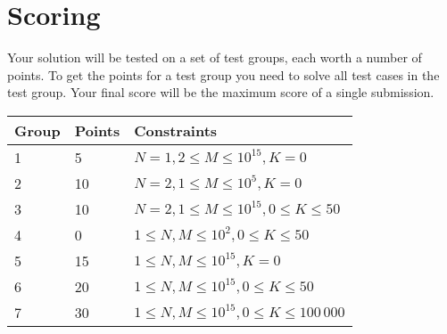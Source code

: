 \section*{Scoring}
Your solution will be tested on a set of test groups, each worth a number of points.
To get the points for a test group you need to solve all test cases in the test group.
Your final score will be the maximum score of a single submission.

\noindent
\begin{tabular}{| l | l | l |}
\hline
Group & Points & Constraints \\ \hline
1     & 5      & $N = 1, 2 \le M \le 10^{15}, K = 0$ \\ \hline
2     & 10     & $N = 2, 1 \le M \le 10^5, K = 0$ \\ \hline
3     & 10     & $N = 2, 1 \le M \le 10^{15}, 0 \le K \le 50$ \\ \hline
4     & 0      & $1 \le N, M \le 10^2, 0 \le K \le 50$ \\ \hline
5     & 15     & $1 \le N, M \le 10^{15}, K = 0$ \\ \hline
6     & 20     & $1 \le N, M \le 10^{15}, 0 \le K \le 50$ \\ \hline
7     & 30     & $1 \le N, M \le 10^{15}, 0 \le K \le 100\,000$ \\ \hline
\end{tabular}

